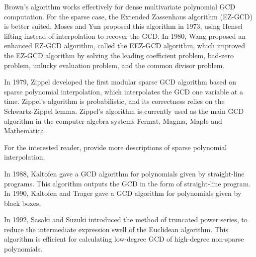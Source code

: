 \documentclass[final,20pt]{elsarticle}
\begin{document}
%
Brown's algorithm works effectively for dense multivariate polynomial GCD computation. For the sparse case, the Extended Zassenhaus algorithm (EZ-GCD) is better suited. Moses and Yun \cite{MosesY73} proposed this algorithm in 1973, using Hensel lifting instead of interpolation to recover the GCD.
%
%
%
In 1980, Wang \cite{Wang80b} proposed an enhanced EZ-GCD algorithm, called the EEZ-GCD algorithm, which improved the EZ-GCD algorithm by solving the leading coefficient problem, bad-zero problem, unlucky evaluation problem, and the common divisor problem.

In 1979, Zippel \cite{Zippel79} developed the first modular sparse GCD algorithm based on sparse polynomial interpolation, which interpolates the GCD one variable at a time.
Zippel's algorithm is probabilistic, and its correctness relies on the Schwartz-Zippel \cite{ZIPPEL1990375} lemma. Zippel's algorithm is currently used as the main GCD algorithm in the computer algebra systems Fermat, Magma, Maple and Mathematica.

For the interested reader, \cite{Ben-OrT88,huang2021sparse2,arnold2016sparse,KaltofenLL00,javadi2010parallel,cuyt2008new,DBLP:conf/issac/Huang19,DBLP:journals/jsc/HuangG20,DBLP:journals/jsc/Huang23} provide more descriptions of sparse polynomial interpolation.

In 1988, Kaltofen \cite{kaltofen1988greatest} gave a GCD algorithm for polynomials given by straight-line programs.
This algorithm outputs the GCD in the form of straight-line program.
%
In 1990, Kaltofen  and Trager \cite{kaltofen1990computing} gave a GCD algorithm for polynomials given by black boxes.

In 1992, Sasaki and Suzuki \cite{SasakiS92} introduced the method of truncated power series, to reduce the intermediate expression swell of the Euclidean algorithm. This algorithm is efficient for calculating low-degree GCD of high-degree non-sparse polynomials.

\end{document}
